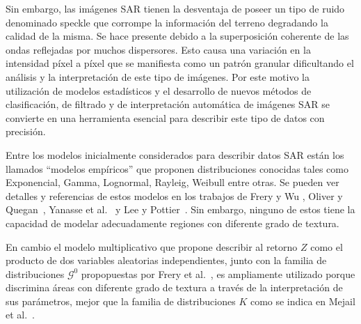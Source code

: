 \documentclass[11pt]{article}
\begin{document}
Sin embargo, las imágenes SAR tienen la desventaja de poseer un tipo de ruido
denominado speckle que corrompe la información del terreno degradando la calidad de la misma.
Se hace presente debido a la superposición coherente de las ondas reflejadas por
muchos dispersores. Esto causa una variación en la intensidad píxel a píxel que se manifiesta como un patrón granular dificultando el análisis y la interpretación de este tipo de imágenes. Por este motivo la utilización de modelos estadísticos y el desarrollo de nuevos métodos de clasificación, de filtrado y de interpretación automática de imágenes SAR se convierte en una herramienta esencial para describir este tipo de datos con precisión.

Entre los modelos inicialmente considerados para describir datos SAR están los llamados ``modelos empíricos'' que proponen distribuciones conocidas tales como Exponencial, Gamma, Lognormal, Rayleig, Weibull entre otras. Se pueden ver detalles y referencias de estos modelos en los trabajos de Frery y Wu \cite{FreryLibro2019}, Oliver y Quegan~\cite{oliverquegan98}, Yanasse et al.~\cite{Yanasse93} y Lee y Pottier~\cite{Lee2009}. 
Sin embargo, ninguno de estos tiene la capacidad de modelar adecuadamente regiones con diferente grado de textura.
%

En cambio el modelo multiplicativo que propone describir al retorno $Z$ como el producto de dos variables aleatorias independientes, junto con la familia de distribuciones $\mathcal{G}^0$ propopuestas por Frery et al.~\cite{Frery97}, es ampliamente utilizado porque discrimina áreas con diferente grado de textura a través de la interpretación de sus parámetros, mejor que la familia de distribuciones $K$ como se indica en Mejail et al.~\cite{MejailJacoboFreryBustos:IJRS}.

\end{document}
